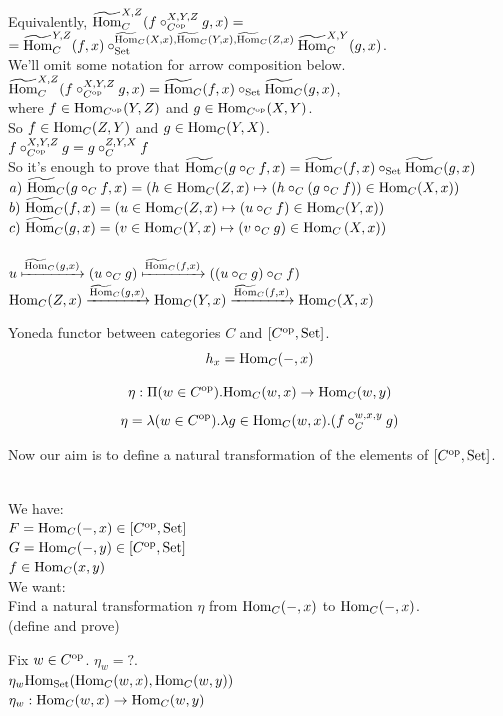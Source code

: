 \documentclass[10pt,a4paper]{article}
\begin{document}
\begin{enumerate}
Equivalently, $\HomMor_C^{X,Z}(f\circ_{C^\op}^{X,Y,Z} g, x)=$\\ $=\HomMor_C^{Y,Z}(f,x)\circ_\Set^{\HomMor_C(X,x),\HomMor_C(Y,x),\HomMor_C(Z,x)} \HomMor_C^{X,Y}(g,x)$.\\
We'll omit some notation for arrow composition below.\\
$\HomMor_C^{X,Z}(f\circ_{C^\op}^{X,Y,Z} g, x)=\HomMor_C(f,x)\circ_\Set \HomMor_C(g,x)$,\\
where $f\in\Hom_{C^\op}(Y,Z)$ and $g\in\Hom_{C^\op}(X,Y)$.\\
So $f\in\Hom_{C}(Z,Y)$ and $g\in\Hom_{C}(Y,X)$.\\
$f\circ_{C^\op}^{X,Y,Z} g = g\circ_{C}^{Z,Y,X} f$\\
So it's enough to prove that $\HomMor_C(g\circ_C f, x) = \HomMor_C(f, x) \circ_\Set \HomMor_C(g, x)$\\
$a)\ \HomMor_C(g\circ_C f, x) = (h \in\Hom_C(Z,x) \mapsto (h \circ_C (g\circ_C f))\in\Hom_C(X,x))$\\
$b)\ \HomMor_C(f, x) = \left(u \in\Hom_C(Z,x) \mapsto (u \circ_C f)\in\Hom_C(Y,x)\right)$\\
$c)\ \HomMor_C(g, x) = \left(v \in\Hom_C(Y,x) \mapsto (v \circ_C g)\in\Hom_C\left(X,x\right)\right)$\\
\\
$u \xmapsto{\HomMor_C(g, x)} (u \circ_C g) \xmapsto{\HomMor_C(f, x)} ((u \circ_C g) \circ_C f)$
\\
$\Hom_C(Z,x) \xrightarrow{\HomMor_C(g, x)} \Hom_C(Y,x) \xrightarrow{\HomMor_C(f, x)} \Hom_C(X,x)$
\\
\end{enumerate}
\myqed
\begin{definition}
Yoneda functor between categories $C$ and $[C^\op,\Set]$.
$$h_x = \Hom_C(-, x)$$
\end{definition}


\begin{definition}
$$\eta : \Pi(w\in C^\op).\Hom_C(w,x)\to \Hom_C(w,y)$$
$$\eta = \lambda (w\in C^\op). \lambda g\in\Hom_C(w,x).(f\circ_C^{w,x,y} g)$$
\end{definition}
Now our aim is to define a natural transformation of the elements of $[C^\op,\Set]$.\\
\begin{lemma}$\textrm{ }$\\
We have:\\
$F=\Hom_C(-,x)\in [C^\op,\Set]$\\
$G=\Hom_C(-,y)\in [C^\op,\Set]$\\
$f\in\Hom_C(x,y)$\\
We want:\\
Find a natural transformation $\eta$ from $\Hom_C(-,x)$ to $\Hom_C(-,x)$.\\ (define and prove)\\
\end{lemma}
Fix $w\in C^\op$. $\eta_w = ?$.\\
$\eta_w\Hom_\Set(\Hom_C(w,x),\Hom_C(w,y))$\\
$\eta_w: \Hom_C(w,x)\to \Hom_C(w,y)$\\
\end{document}
